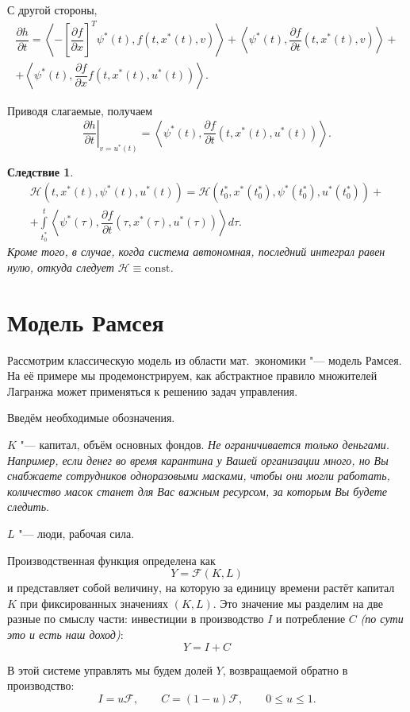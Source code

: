 \documentclass[12pt, a4paper]{article}
\theoremstyle{rusdef}
\newtheorem{corollary}{Следствие}
\renewcommand{\H}{\mathcal{H}} %
\renewcommand{\d}{\partial} %
\begin{document}
С другой стороны,
\begin{multline*}
  \dfrac{\d h}{\d t} = \left< - \left[\dfrac{\d f}{\d x}\right]^T \psi^*(t), f(t, x^*(t), v) \right> +
  \left< \psi^*(t), \dfrac{\d f}{\d t}(t, x^*(t), v) \right> + \\ +
  \left< \psi^*(t), \dfrac{\d f}{\d x} f(t, x^*(t), u^*(t)) \right>.
\end{multline*}

Приводя слагаемые, получаем
\[
  \left. \dfrac{\d h}{\d t} \right\vert_{v = u^*(t)} = \left< \psi^*(t), \dfrac{\d f}{\d t} (t, x^*(t), u^*(t)) \right>.
\]

\begin{corollary}
  \begin{multline*}
    \H(t, x^*(t), \psi^*(t), u^*(t)) = \H(t_0^*, x^*(t_0^*), \psi^*(t_0^*), u^*(t_0^*)) + \\
    + \int\limits_{t_0^*}^{t} \left< \psi^*(\tau), \dfrac{\d f}{\d t} (\tau, x^*(\tau), u^*(\tau)) \right> d\tau.
  \end{multline*}
  Кроме того, в случае, когда система автономная, последний интеграл равен нулю, откуда следует $\H \equiv \mathrm{const}$.
\end{corollary}

\section{Модель Рамсея}
Рассмотрим классическую модель из области мат.~экономики "--- модель Рамсея. На её примере мы продемонстрируем, как абстрактное правило множителей Лагранжа может применяться к решению задач управления.

Введём необходимые обозначения.

$K$ "--- капитал, объём основных фондов. \textit{Не ограничивается только деньгами. Например, если денег во время карантина у Вашей организации много, но Вы снабжаете сотрудников одноразовыми масками, чтобы они могли работать, количество масок станет для Вас важным ресурсом, за которым Вы будете следить}.

$L$ "--- люди, рабочая сила.

Производственная функция определена как
\[ Y = \mathcal{F}(K, L) \]
и представляет собой величину, на которую за единицу времени растёт капитал $K$ при фиксированных значениях $(K, L)$. Это значение мы разделим на две разные по смыслу части: инвестиции в производство $I$ и потребление $C$ \textit{(по сути это и есть наш доход)}:
\[ Y = I + C \]

В этой системе управлять мы будем долей $Y$, возвращаемой обратно в производство:
\[ I = u\mathcal{F}, \qquad C = (1-u)\mathcal{F}, \qquad 0 \leqslant u \leqslant 1. \]
\end{document}
